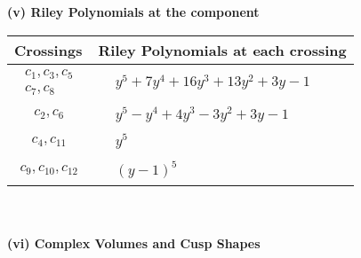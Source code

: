 \documentclass[1p]{elsarticle_modified}
\theoremstyle{definition}
\begin{document}
\newpage\renewcommand{\arraystretch}{1}
\flushleft \textbf{(v) Riley Polynomials at the component}\newline \\
\begin{tabular}{m{50pt}|m{274pt}}
Crossings & \hspace{64pt}Riley Polynomials at each crossing \\
\hline $$\begin{aligned}c_{1},c_{3},c_{5}\\c_{7},c_{8}\end{aligned}$$&$\begin{aligned}
&y^5+7 y^4+16 y^3+13 y^2+3 y-1
\end{aligned}$\\
\hline $$\begin{aligned}c_{2},c_{6}\end{aligned}$$&$\begin{aligned}
&y^5- y^4+4 y^3-3 y^2+3 y-1
\end{aligned}$\\
\hline $$\begin{aligned}c_{4},c_{11}\end{aligned}$$&$\begin{aligned}
&y^5
\end{aligned}$\\
\hline $$\begin{aligned}c_{9},c_{10},c_{12}\end{aligned}$$&$\begin{aligned}
&(y-1)^5
\end{aligned}$\\
\hline
\end{tabular}\\~\\
\newpage\flushleft \textbf{(vi) Complex Volumes and Cusp Shapes}
\end{document}

